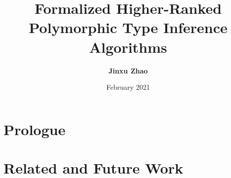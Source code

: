 



\title{Formalized Higher-Ranked Polymorphic Type Inference Algorithms}
\author{\textbf{Jinxu Zhao}}
\date{February 2021}




\maketitle

\begin{abstract}
 
\end{abstract}


\frontmatter
\makedeclaration
\makeAck
\tableofcontents
\listoffigures
\listoftables

\mainmatter

\part{Prologue}





%
%
%
%
%
%
%
%
%








\part{Related and Future Work}

